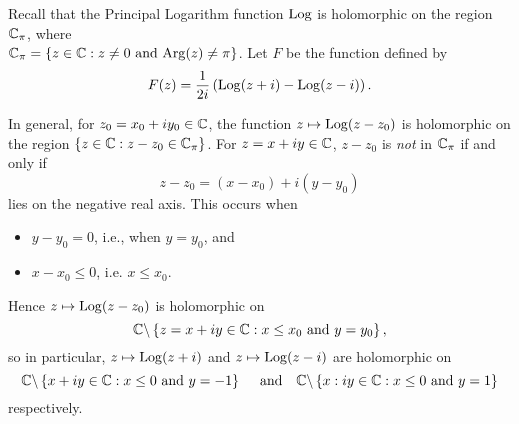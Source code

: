 \begin{questions}
\begin{answer}
\end{answer}
\question Recall that the Principal Logarithm function $\operatorname{Log}$ is holomorphic on the region $\mathbb{C}_{\pi}$, where \\ $\mathbb{C}_{\pi} = \left\{z \in \mathbb{C}:z \neq 0 \text{ and } \mathrm{Arg} (z) \neq \pi \right\}$. Let $F$ be the function defined by
\[
F(z) = \frac{1}{2i} \left( \operatorname{Log} (z+i)-\operatorname{Log}(z-i) \right).
\]
\begin{answer}
In general, for $z_0 = x_0+iy_0 \in \mathbb{C}$, the function
$
z \mapsto \operatorname{Log} (z-z_0)
$
is holomorphic on the region $\left\{ z \in \mathbb{C}: z-z_0 \in \mathbb{C}_{\pi} \right\}$.  For $z=x+iy \in \mathbb{C}$, $z-z_0$ is \emph{not} in $\mathbb{C}_{\pi}$ if and only if
\[
z-z_0 = (x-x_0) + i (y-y_0)
\]
lies on the negative real axis.  This occurs when
\begin{itemize}
\item $y-y_0=0$, i.e., when $y=y_0$, and
\item $x-x_0 \leq 0$, i.e. $x \leq x_0$.
\end{itemize}
Hence $z \mapsto \operatorname{Log} (z-z_0)$ is holomorphic on
\[
\mathbb{C} \backslash \left\{z = x+iy \in \mathbb{C}: x \leq x_0 \text{ and } y=y_0\right\},
\]
so in particular, $z \mapsto \operatorname{Log} (z+i)$ and $ z \mapsto \operatorname{Log}(z-i)$ are holomorphic on 
\[ \mathbb{C} \backslash \left\{x+iy \in \mathbb{C}: x \leq 0 \text{ and } y=-1\right\}\quad\text{ and}\quad \mathbb{C} \backslash \left\{x:iy \in \mathbb{C}: x \leq 0 \text{ and } y=1\right\} \]
respectively.


\end{answer}
\end{questions}
